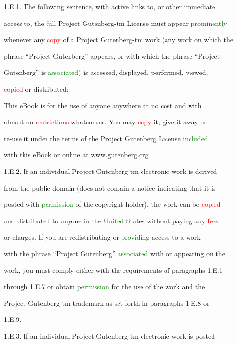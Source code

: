  1.E.1. The following \textcolor{BurntOrange}{sentence,} with active links to, or other immediate

 access to, the \textcolor{green}{full} Project Gutenberg-tm License must appear \textcolor{green}{prominently}

 whenever any \textcolor{red}{copy} of a Project Gutenberg-tm work (any work on which the

 phrase “Project Gutenberg” appears, or with which the phrase “Project

 Gutenberg” is \textcolor{green}{associated)} is accessed, displayed, performed, viewed,

 \textcolor{red}{copied} or distributed:



 This eBook is for the use of anyone anywhere at no cost and with

 almost no \textcolor{red}{restrictions} whatsoever. You may \textcolor{red}{copy} it, give it away or

 re-use it under the terms of the Project Gutenberg License \textcolor{green}{included}

 with this eBook or online at www.gutenberg.org



 1.E.2. If an individual Project Gutenberg-tm electronic work is derived

 from the \textcolor{BurntOrange}{public} domain (does not contain a notice indicating that it is

 posted with \textcolor{green}{permission} of the copyright holder), the work can be \textcolor{red}{copied}

 and distributed to anyone in the \textcolor{green}{United} States without \textcolor{BurntOrange}{paying} any \textcolor{red}{fees}

 or charges. If you are redistributing or \textcolor{green}{providing} access to a work

 with the phrase “Project Gutenberg” \textcolor{green}{associated} with or appearing on the

 work, you must comply either with the requirements of paragraphs 1.E.1

 through 1.E.7 or obtain \textcolor{green}{permission} for the use of the work and the

 Project Gutenberg-tm trademark as set forth in paragraphs 1.E.8 or

 1.E.9.



 1.E.3. If an individual Project Gutenberg-tm electronic work is posted

